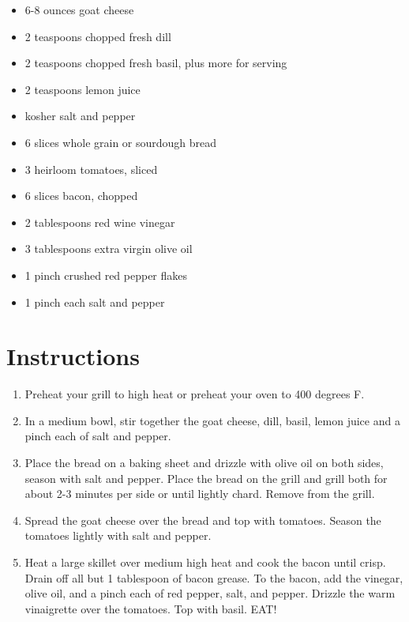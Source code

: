 \documentclass[
  letterpaper,
  DIV=11,
  numbers=noendperiod,
  titlepage=false]{scrreprt}
\providecommand{\tightlist}{%
  \setlength{\itemsep}{0pt}\setlength{\parskip}{0pt}}\usepackage{longtable,booktabs,array}
\begin{document}
\begin{itemize}
\tightlist
\item
  6-8 ounces goat cheese
\item
  2 teaspoons chopped fresh dill
\item
  2 teaspoons chopped fresh basil, plus more for serving
\item
  2 teaspoons lemon juice
\item
  kosher salt and pepper
\item
  6 slices whole grain or sourdough bread
\item
  3 heirloom tomatoes, sliced
\item
  6 slices bacon, chopped
\item
  2 tablespoons red wine vinegar
\item
  3 tablespoons extra virgin olive oil
\item
  1 pinch crushed red pepper flakes
\item
  1 pinch each salt and pepper
\end{itemize}

\section{Instructions}\label{instructions-68}

\begin{enumerate}
\def\labelenumi{\arabic{enumi}.}
\tightlist
\item
  Preheat your grill to high heat or preheat your oven to 400 degrees F.
\item
  In a medium bowl, stir together the goat cheese, dill, basil, lemon
  juice and a pinch each of salt and pepper.
\item
  Place the bread on a baking sheet and drizzle with olive oil on both
  sides, season with salt and pepper. Place the bread on the grill and
  grill both for about 2-3 minutes per side or until lightly chard.
  Remove from the grill.
\item
  Spread the goat cheese over the bread and top with tomatoes. Season
  the tomatoes lightly with salt and pepper.
\item
  Heat a large skillet over medium high heat and cook the bacon until
  crisp. Drain off all but 1 tablespoon of bacon grease. To the bacon,
  add the vinegar, olive oil, and a pinch each of red pepper, salt, and
  pepper. Drizzle the warm vinaigrette over the tomatoes. Top with
  basil. EAT!
\end{enumerate}
\end{document}
